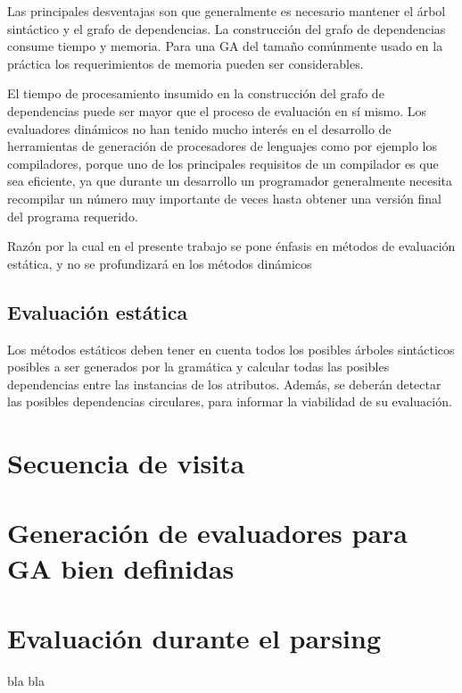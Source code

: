 Las principales desventajas son que generalmente es necesario mantener el árbol sintáctico y el grafo de dependencias. La construcción del grafo de dependencias consume tiempo y memoria. Para una GA del tamaño comúnmente usado en la práctica los requerimientos de memoria pueden ser considerables.

El tiempo de procesamiento insumido en la construcción del grafo de dependencias puede ser mayor que el proceso de evaluación en sí mismo. Los evaluadores dinámicos no han tenido mucho interés en el desarrollo de herramientas de generación de procesadores de lenguajes como por ejemplo los compiladores, porque uno de los principales requisitos de un compilador es que sea eficiente, ya que durante un desarrollo un programador generalmente necesita recompilar un número muy importante de veces hasta obtener una versión final del programa requerido.

Razón por la cual en el presente trabajo se pone énfasis en métodos de evaluación estática, y no se profundizará en los métodos dinámicos

\subsection{Evaluación estática}
Los métodos estáticos deben tener en cuenta todos los posibles árboles sintácticos posibles a ser generados por la gramática y calcular todas las posibles dependencias entre las instancias de los atributos. Además, se deberán detectar las posibles dependencias circulares, para informar la viabilidad de su evaluación.

\section{Secuencia de visita}
\section{Generación de evaluadores para GA bien definidas}
\section{Evaluación durante el parsing}

bla bla

